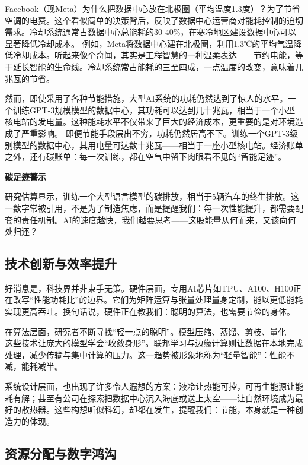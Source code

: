 Facebook（现Meta）为什么把数据中心放在北极圈（平均温度1.3度）？为了节省空调的电费。这个看似简单的决策背后，反映了数据中心运营商对能耗控制的迫切需求。冷却系统通常占数据中心总能耗的30-40\%，在寒冷地区建设数据中心可以显著降低冷却成本。
例如，Meta将数据中心建在北极圈，利用1.3℃的平均气温降低冷却成本。听起来像个奇闻，其实是工程智慧的一种温柔表达——节约电能，等于延长智能的生命线。冷却系统常占能耗的三至四成，一点温度的改变，意味着几兆瓦的节省。

然而，即使采用了各种节能措施，大型AI系统的功耗仍然达到了惊人的水平。一个训练GPT-3规模模型的数据中心，其功耗可以达到几十兆瓦，相当于一个小型核电站的发电量。这种能耗水平不仅带来了巨大的经济成本，更重要的是对环境造成了严重影响。
即便节能手段层出不穷，功耗仍然居高不下。训练一个GPT-3级别模型的数据中心，其用电量可达数十兆瓦——相当于一座小型核电站。经济账单之外，还有碳账单：每一次训练，都在空气中留下肉眼看不见的“智能足迹”。

{\bf 碳足迹警示}

研究估算显示，训练一个大型语言模型的碳排放，相当于5辆汽车的终生排放。这一数字常被引用，不是为了制造焦虑，而是提醒我们：每一次性能提升，都需要配套的责任机制。AI的速度越快，我们越要思考——这股能量从何而来，又该向何处归还？

\subsection{技术创新与效率提升}

好消息是，科技界并非束手无策。硬件层面，专用AI芯片如TPU、A100、H100正在改写“性能功耗比”的边界。它们为矩阵运算与张量处理量身定制，能以更低能耗实现更高吞吐。换句话说，硬件正在教我们：聪明的算法，也需要节俭的身体。

在算法层面，研究者不断寻找“轻一点的聪明”。模型压缩、蒸馏、剪枝、量化——这些技术让庞大的模型学会“收敛身形”。联邦学习与边缘计算则让数据在本地完成处理，减少传输与集中计算的压力。这一趋势被形象地称为“轻量智能”：性能不减，能耗减半。

系统设计层面，也出现了许多令人遐想的方案：液冷让热能可控，可再生能源让能耗有解；甚至有公司在探索把数据中心沉入海底或送上太空——让自然环境成为最好的散热器。这些构想听似科幻，却都在发生，提醒我们：节能，本身就是一种创造力的体现。

\subsection{资源分配与数字鸿沟}

